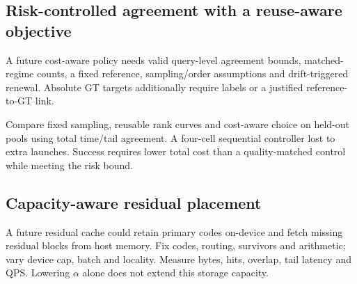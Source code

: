 \subsection{Risk-controlled agreement with a reuse-aware objective}

A future cost-aware policy needs valid query-level agreement bounds, matched-regime counts, a fixed reference, sampling/order assumptions and drift-triggered renewal. Absolute GT targets additionally require labels or a justified reference-to-GT link.

Compare fixed sampling, reusable rank curves and cost-aware choice on held-out pools using total time/tail agreement. A four-cell sequential controller lost to extra launches. Success requires lower total cost than a quality-matched control while meeting the risk bound.

\subsection{Capacity-aware residual placement}

A future residual cache could retain primary codes on-device and fetch missing residual blocks from host memory. Fix codes, routing, survivors and arithmetic; vary device cap, batch and locality. Measure bytes, hits, overlap, tail latency and QPS. Lowering $\alpha$ alone does not extend this storage capacity.